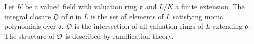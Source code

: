 Let $K$ be a valued field with valuation ring $\mathfrak{o}$ and $L/K$ a finite extension. The integral closure $\mathfrak{O}$ of $\mathfrak{o}$ in $L$ is the set of elements of $L$ satisfying monic polynomials over $\mathfrak{o}$. $\mathfrak{O}$ is the intersection of all valuation rings of $L$ extending $\mathfrak{o}$. The structure of $\mathfrak{O}$ is described by ramification theory.
